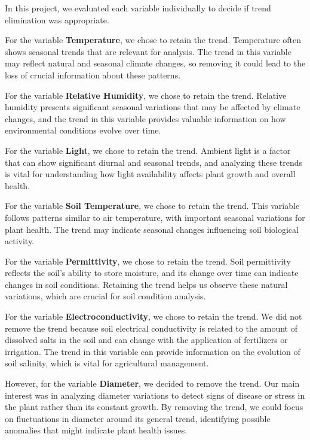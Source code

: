 In this project, we evaluated each variable individually to decide if trend elimination was appropriate.

For the variable \textbf{Temperature}, we chose to retain the trend. Temperature often shows seasonal trends that are relevant for analysis. The trend in this variable may reflect natural and seasonal climate changes, so removing it could lead to the loss of crucial information about these patterns.

For the variable \textbf{Relative Humidity}, we chose to retain the trend. Relative humidity presents significant seasonal variations that may be affected by climate changes, and the trend in this variable provides valuable information on how environmental conditions evolve over time.

For the variable \textbf{Light}, we chose to retain the trend. Ambient light is a factor that can show significant diurnal and seasonal trends, and analyzing these trends is vital for understanding how light availability affects plant growth and overall health.

For the variable \textbf{Soil Temperature}, we chose to retain the trend. This variable follows patterns similar to air temperature, with important seasonal variations for plant health. The trend may indicate seasonal changes influencing soil biological activity.

For the variable \textbf{Permittivity}, we chose to retain the trend. Soil permittivity reflects the soil's ability to store moisture, and its change over time can indicate changes in soil conditions. Retaining the trend helps us observe these natural variations, which are crucial for soil condition analysis.

For the variable \textbf{Electroconductivity}, we chose to retain the trend. We did not remove the trend because soil electrical conductivity is related to the amount of dissolved salts in the soil and can change with the application of fertilizers or irrigation. The trend in this variable can provide information on the evolution of soil salinity, which is vital for agricultural management.

However, for the variable \textbf{Diameter}, we decided to remove the trend. Our main interest was in analyzing diameter variations to detect signs of disease or stress in the plant rather than its constant growth. By removing the trend, we could focus on fluctuations in diameter around its general trend, identifying possible anomalies that might indicate plant health issues.

